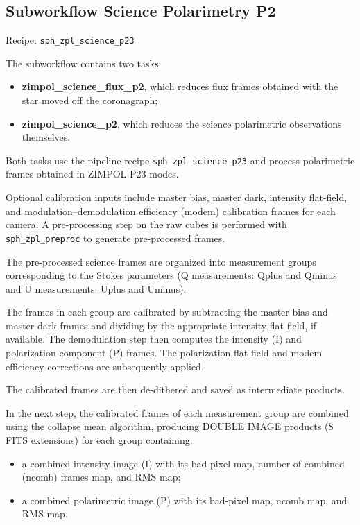 
\subsection{Subworkflow Science Polarimetry P2}

Recipe: \texttt{sph\_zpl\_science\_p23}

The subworkflow contains two tasks:

\begin{itemize}
\item \textbf{zimpol\_science\_flux\_p2}, which reduces flux frames obtained with the star moved off the coronagraph;
\item \textbf{zimpol\_science\_p2}, which reduces the science polarimetric observations themselves.
\end{itemize}

Both tasks use the pipeline recipe \texttt{sph\_zpl\_science\_p23} and process polarimetric frames obtained in ZIMPOL P23 modes.

Optional calibration inputs include master bias, master dark, intensity flat-field, and modulation--demodulation efficiency (modem) calibration frames for each camera.
A pre-processing step on the raw cubes is performed with \texttt{sph\_zpl\_preproc} to generate pre-processed frames.

The pre-processed science frames are organized into measurement groups corresponding to the Stokes parameters
(Q measurements: Qplus and Qminus and U measurements: Uplus and Uminus).

The frames in each group are calibrated by subtracting the master bias and master dark frames and dividing by the appropriate intensity flat field, if available.
The demodulation step then computes the intensity (I) and polarization component (P) frames.
The polarization flat-field and modem efficiency corrections are subsequently applied.

The calibrated frames are then de-dithered and saved as intermediate products.

In the next step, the calibrated frames of each measurement group are combined using the collapse mean algorithm,
producing DOUBLE IMAGE products (8 FITS extensions) for each group containing:

\begin{itemize}
\item a combined intensity image (I) with its bad-pixel map, number-of-combined (ncomb) frames map, and RMS map;
\item a combined polarimetric image (P) with its bad-pixel map, ncomb map, and RMS map.
\end{itemize}

